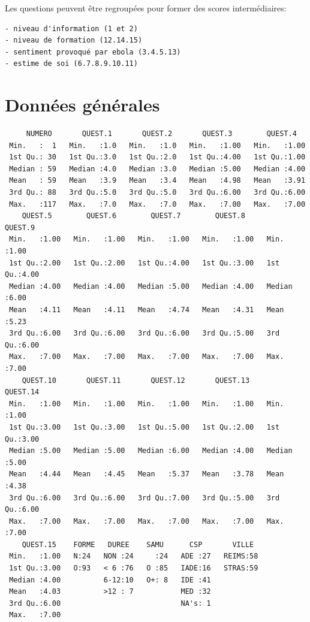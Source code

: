\documentclass[]{article}
\begin{document}
Les questions peuvent être regroupées pour former des scores
intermédiaires:

\begin{verbatim}
- niveau d'information (1 et 2)
- niveau de formation (12.14.15)
- sentiment provoqué par ebola (3.4.5.13)
- estime de soi (6.7.8.9.10.11)
\end{verbatim}

\section{Données générales}\label{donnees-generales}

\begin{verbatim}
     NUMERO       QUEST.1       QUEST.2       QUEST.3        QUEST.4    
 Min.   :  1   Min.   :1.0   Min.   :1.0   Min.   :1.00   Min.   :1.00  
 1st Qu.: 30   1st Qu.:3.0   1st Qu.:2.0   1st Qu.:4.00   1st Qu.:1.00  
 Median : 59   Median :4.0   Median :3.0   Median :5.00   Median :4.00  
 Mean   : 59   Mean   :3.9   Mean   :3.4   Mean   :4.98   Mean   :3.91  
 3rd Qu.: 88   3rd Qu.:5.0   3rd Qu.:5.0   3rd Qu.:6.00   3rd Qu.:6.00  
 Max.   :117   Max.   :7.0   Max.   :7.0   Max.   :7.00   Max.   :7.00  
    QUEST.5        QUEST.6        QUEST.7        QUEST.8        QUEST.9    
 Min.   :1.00   Min.   :1.00   Min.   :1.00   Min.   :1.00   Min.   :1.00  
 1st Qu.:2.00   1st Qu.:2.00   1st Qu.:4.00   1st Qu.:3.00   1st Qu.:4.00  
 Median :4.00   Median :4.00   Median :5.00   Median :4.00   Median :6.00  
 Mean   :4.11   Mean   :4.11   Mean   :4.74   Mean   :4.31   Mean   :5.23  
 3rd Qu.:6.00   3rd Qu.:6.00   3rd Qu.:6.00   3rd Qu.:5.00   3rd Qu.:6.00  
 Max.   :7.00   Max.   :7.00   Max.   :7.00   Max.   :7.00   Max.   :7.00  
    QUEST.10       QUEST.11       QUEST.12       QUEST.13       QUEST.14   
 Min.   :1.00   Min.   :1.00   Min.   :1.00   Min.   :1.00   Min.   :1.00  
 1st Qu.:3.00   1st Qu.:3.00   1st Qu.:5.00   1st Qu.:2.00   1st Qu.:3.00  
 Median :5.00   Median :5.00   Median :6.00   Median :4.00   Median :5.00  
 Mean   :4.44   Mean   :4.45   Mean   :5.37   Mean   :3.78   Mean   :4.38  
 3rd Qu.:6.00   3rd Qu.:6.00   3rd Qu.:7.00   3rd Qu.:5.00   3rd Qu.:6.00  
 Max.   :7.00   Max.   :7.00   Max.   :7.00   Max.   :7.00   Max.   :7.00  
    QUEST.15    FORME   DUREE    SAMU      CSP       VILLE   
 Min.   :1.00   N:24   NON :24     :24   ADE :27   REIMS:58  
 1st Qu.:3.00   O:93   < 6 :76   O :85   IADE:16   STRAS:59  
 Median :4.00          6-12:10   O+: 8   IDE :41             
 Mean   :4.03          >12 : 7           MED :32             
 3rd Qu.:6.00                            NA's: 1             
 Max.   :7.00                                                
\end{verbatim}
\end{document}
